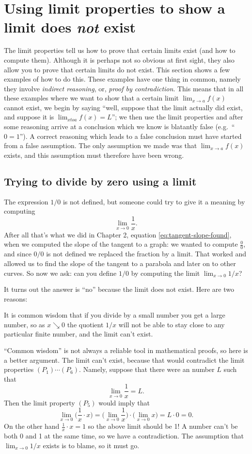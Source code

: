 \section{Using limit properties to show a limit does \emph{not} exist}
The limit properties tell us how to prove that certain limits exist (and
how to compute them).  Although it is perhaps not so obvious at first
sight, they also allow you to prove that certain limits do not exist.  
This section shows a few examples of how to do this.  These examples
have one thing in common, namely they involve \emph{indirect reasoning},
or, \emph{proof by contradiction}.  This means that in all these examples
where we want to show that a certain limit $\lim_{x\to a} f(x)$ cannot
exist, we begin by saying ``well, suppose that the limit actually did
exist, and suppose it is $\lim_{xto a} f(x) = L$'';  we then use the
limit properties and after some reasoning arrive at a conclusion which
we know is blatantly false (e.g.~``$0=1$'').  
A correct reasoning which leads to a false conclusion must have
started from a false assumption.  The only assumption we made was that
$\lim_{x\to a} f(x)$ exists, and this assumption must therefore have
been wrong.


\subsection{Trying to divide by zero using a limit}%
\label{sec:xinverse-atzero-nolimit}%
The expression $1/0$ is not defined, but someone could try to give it
a meaning by computing
\[
\lim_{x\to0}\frac1x.
\]
After all that's what we did in Chapter 2, equation
\eqref{eq:tangent-slope-found}, when we computed the slope of the
tangent to a graph: we wanted to compute $\frac00$, and since $0/0$ is
not defined we replaced the fraction by a limit.  That worked and
allowed us to find the slope of the tangent to a parabola and later on
to other curves.  So now we ask: can you define $1/0$ by computing the
limit $\lim_{x\to0} 1/x$?

It turns out the answer is ``no'' because the limit does not exist.
Here are two reasons:

It is common wisdom that if you divide by a small number you get a large
number, so as $x\searrow 0$ the quotient $1/x$ will not be able to stay
close to any particular finite number, and the limit can't exist.

``Common wisdom'' is not always a reliable tool in mathematical proofs, so
here is a better argument.  The limit can't exist, because that would
contradict the limit properties $(P_1)\cdots(P_6)$.  Namely, suppose that
there were an number $L$ such that
\[
\lim_{x\to0} \frac 1 x = L.
\]
Then the limit property $(P_5)$ would imply that
\[
\lim_{x\to0}\bigl(\frac 1x\cdot x \bigr) = \bigl(\lim_{x\to0}\frac
1x\bigr)\cdot \bigl(\lim_{x\to0} x\bigr) = L\cdot 0 =0.
\]
On the other hand $\frac 1x \cdot x =1$ so the above limit should be 1!  A
number can't be both 0 and 1 at the same time, so we have a
contradiction. The assumption that $\lim_{x\to0}1/x$ exists is to blame, so
it must go.

